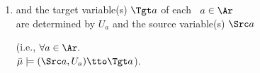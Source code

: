 \begin{defn}[\scibility]
\begin{enumerate}[label=(\alph*),itemsep=0pt,topsep=0.0ex,parsep=0.5ex]
%
\item
and 
the target variable(s) $\Tgt a$ of each \arc\ $a \in \Ar$ \\ are determined
    by $U_a$ and the source variable(s) $\Src a$
    \hfill%
    \parbox[t]{0.28\linewidth}{\singlespacing
        (i.e., $\forall a \in \Ar.$\\\phantom{(}$\bar\mu \models (\Src a, U_a) \tto \Tgt a$).
        }
\end{enumerate}



\end{defn}
